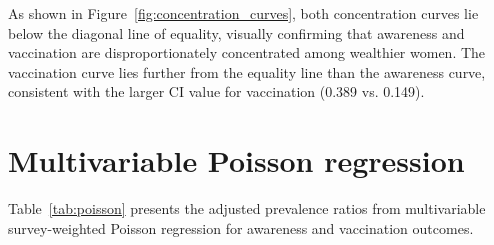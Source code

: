 As shown in Figure~\ref{fig:concentration_curves}, both concentration curves lie below the diagonal line of equality, visually confirming that awareness and vaccination are disproportionately concentrated among wealthier women. The vaccination curve lies further from the equality line than the awareness curve, consistent with the larger CI value for vaccination (0.389 vs. 0.149).

\section{Multivariable Poisson regression}

Table~\ref{tab:poisson} presents the adjusted prevalence ratios from multivariable survey-weighted Poisson regression for awareness and vaccination outcomes.

